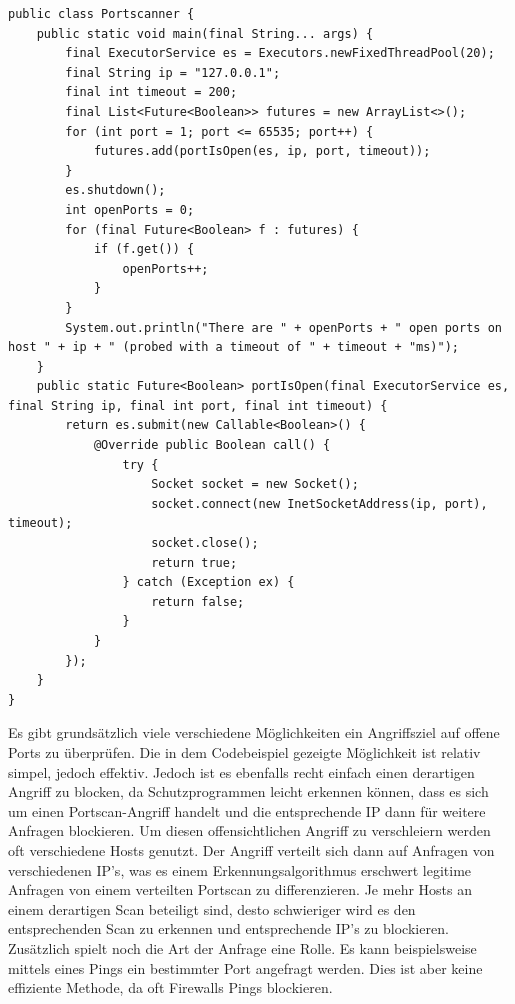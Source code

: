 \begin{scriptsize}
\begin{lstlisting}
public class Portscanner {
    public static void main(final String... args) {
        final ExecutorService es = Executors.newFixedThreadPool(20);
        final String ip = "127.0.0.1";
        final int timeout = 200;
        final List<Future<Boolean>> futures = new ArrayList<>();
        for (int port = 1; port <= 65535; port++) {
            futures.add(portIsOpen(es, ip, port, timeout));
        }
        es.shutdown();
        int openPorts = 0;
        for (final Future<Boolean> f : futures) {
            if (f.get()) {
                openPorts++;
            }
        }
        System.out.println("There are " + openPorts + " open ports on host " + ip + " (probed with a timeout of " + timeout + "ms)");
    }
    public static Future<Boolean> portIsOpen(final ExecutorService es, final String ip, final int port, final int timeout) {
        return es.submit(new Callable<Boolean>() {
            @Override public Boolean call() {
                try {
                    Socket socket = new Socket();
                    socket.connect(new InetSocketAddress(ip, port), timeout);
                    socket.close();
                    return true;
                } catch (Exception ex) {
                    return false;
                }
            }
        });
    }
}
\end{lstlisting}
\end{scriptsize}

Es gibt grundsätzlich viele verschiedene Möglichkeiten ein Angriffsziel auf offene Ports zu überprüfen. Die in dem Codebeispiel gezeigte Möglichkeit ist relativ simpel, jedoch effektiv. Jedoch ist es ebenfalls recht einfach einen derartigen Angriff zu blocken, da Schutzprogrammen leicht erkennen können, dass es sich um einen Portscan-Angriff handelt und die entsprechende IP dann für weitere Anfragen blockieren. Um diesen offensichtlichen Angriff zu verschleiern werden oft verschiedene Hosts genutzt. Der Angriff verteilt sich dann auf Anfragen von verschiedenen IP's, was es einem Erkennungsalgorithmus erschwert legitime Anfragen von einem verteilten Portscan zu differenzieren. Je mehr Hosts an einem derartigen Scan beteiligt sind, desto schwieriger wird es den entsprechenden Scan zu erkennen und entsprechende IP's zu blockieren. Zusätzlich spielt noch die Art der Anfrage eine Rolle. Es kann beispielsweise mittels eines Pings ein bestimmter Port angefragt werden. Dies ist aber keine effiziente Methode, da oft Firewalls Pings blockieren.


